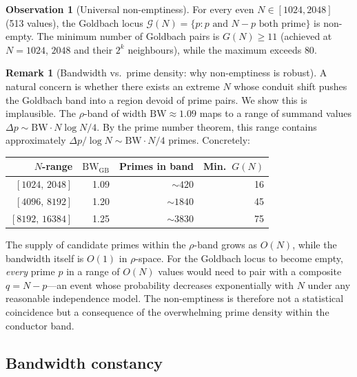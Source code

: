 \documentclass[11pt,a4paper]{article}
\theoremstyle{definition}
\newtheorem{remark}[theorem]{Remark}
\newtheorem{observation}[theorem]{Observation}
\begin{document}
\begin{observation}[Universal non-emptiness]\label{obs:nonempty}
  For every even $N \in [1024, 2048]$ (513 values), the Goldbach locus
  $\mathscr{G}(N) = \{p : p \text{ and } N - p \text{ both prime}\}$ is non-empty.
  The minimum number of Goldbach pairs is $G(N) \geq 11$ (achieved at
  $N = 1024$, $2048$ and their $2^k$ neighbours), while the maximum exceeds $80$.
\end{observation}

\begin{remark}[Bandwidth vs.\ prime density: why non-emptiness is robust]\label{rem:density}
  A natural concern is whether there exists an extreme $N$ whose conduit shift
  pushes the Goldbach band into a region devoid of prime pairs.  We show this is
  implausible.  The $\rho$-band of width $\mathrm{BW} \approx 1.09$ maps to a
  range of summand values $\Delta p \sim \mathrm{BW} \cdot N\log N / 4$.
  By the prime number theorem, this range contains approximately
  $\Delta p / \log N \sim \mathrm{BW} \cdot N / 4$ primes.  Concretely:

  \begin{center}
  \begin{tabular}{rrrr}
  \toprule
  $N$-range & $\mathrm{BW_{GB}}$ & Primes in band & Min.\ $G(N)$ \\
  \midrule
  $[1024,\, 2048]$  & 1.09 & $\sim 420$ & 16 \\
  $[4096,\, 8192]$  & 1.20 & $\sim 1840$ & 45 \\
  $[8192,\, 16384]$ & 1.25 & $\sim 3830$ & 75 \\
  \bottomrule
  \end{tabular}
  \end{center}

  The supply of candidate primes within the $\rho$-band grows as $O(N)$, while
  the bandwidth itself is $O(1)$ in $\rho$-space.  For the Goldbach locus to
  become empty, \emph{every} prime $p$ in a range of $O(N)$ values would need
  to pair with a composite $q = N - p$---an event whose probability decreases
  exponentially with $N$ under any reasonable independence model.  The
  non-emptiness is therefore not a statistical coincidence but a consequence of
  the overwhelming prime density within the conductor band.
\end{remark}

\subsection{Bandwidth constancy}
\end{document}
